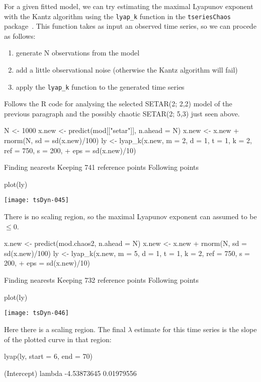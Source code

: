\documentclass[a4paper]{article}
\begin{document}
For a given fitted model, we can try estimating the maximal Lyapunov exponent with the Kantz algorithm 
using the \texttt{lyap\_k} function in the \texttt{tseriesChaos} package~\cite{tseriesChaos2005,TISEAN1999}. 
This function takes as input an observed time series, so we can procede as follows:
\begin{enumerate}
\item generate N observations from the model
\item add a little observational noise (otherwise the Kantz algorithm will fail)
\item apply the \texttt{lyap\_k} function to the generated time series
\end{enumerate}

Follows the R code for analysing the selected SETAR(2; 2,2) model of the previous paragraph and the possibly chaotic 
SETAR(2; 5,3) just seen above.
\begin{Schunk}
\begin{Sinput}
 N <- 1000
 x.new <- predict(mod[["setar"]], n.ahead = N)
 x.new <- x.new + rnorm(N, sd = sd(x.new)/100)
 ly <- lyap_k(x.new, m = 2, d = 1, t = 1, k = 2, ref = 750, s = 200, 
+     eps = sd(x.new)/10)
\end{Sinput}
\begin{Soutput}
Finding nearests
Keeping  741  reference points
Following points
\end{Soutput}
\begin{Sinput}
 plot(ly)
\end{Sinput}
\end{Schunk}
\texttt{[image: tsDyn-045]}

There is no scaling region, so the maximal Lyapunov exponent can assumed to be $\leq 0$.
\begin{Schunk}
\begin{Sinput}
 x.new <- predict(mod.chaos2, n.ahead = N)
 x.new <- x.new + rnorm(N, sd = sd(x.new)/100)
 ly <- lyap_k(x.new, m = 5, d = 1, t = 1, k = 2, ref = 750, s = 200, 
+     eps = sd(x.new)/10)
\end{Sinput}
\begin{Soutput}
Finding nearests
Keeping  732  reference points
Following points
\end{Soutput}
\begin{Sinput}
 plot(ly)
\end{Sinput}
\end{Schunk}
\texttt{[image: tsDyn-046]}

Here there is a scaling region. The final $\lambda$ estimate for this time series is the slope of the plotted curve in that region:
\begin{Schunk}
\begin{Sinput}
 lyap(ly, start = 6, end = 70)
\end{Sinput}
\begin{Soutput}
(Intercept)      lambda 
-4.53873645  0.01979556 
\end{Soutput}
\end{Schunk}
\end{document}
